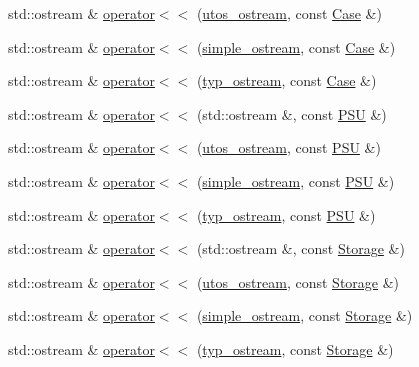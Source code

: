 \begin{DoxyCompactItemize}
\item 
std\+::ostream \& \mbox{\hyperlink{_parts_8h_ad6296c753aa62252b017bf4c78043d19}{operator$<$$<$}} (\mbox{\hyperlink{structutos__ostream}{utos\+\_\+ostream}}, const \mbox{\hyperlink{class_case}{Case}} \&)
\item 
std\+::ostream \& \mbox{\hyperlink{_parts_8h_aeefc09510afc2ba8ce5209d9bdf148eb}{operator$<$$<$}} (\mbox{\hyperlink{structsimple__ostream}{simple\+\_\+ostream}}, const \mbox{\hyperlink{class_case}{Case}} \&)
\item 
std\+::ostream \& \mbox{\hyperlink{_parts_8h_a2789caab23481c04ce93add5191f9e34}{operator$<$$<$}} (\mbox{\hyperlink{structtyp__ostream}{typ\+\_\+ostream}}, const \mbox{\hyperlink{class_case}{Case}} \&)
\item 
std\+::ostream \& \mbox{\hyperlink{_parts_8h_a1f7600c301fc3b2fbca76e13f0631ed7}{operator$<$$<$}} (std\+::ostream \&, const \mbox{\hyperlink{class_p_s_u}{P\+SU}} \&)
\item 
std\+::ostream \& \mbox{\hyperlink{_parts_8h_afea0ac8a7df9128093f476a85a5916ac}{operator$<$$<$}} (\mbox{\hyperlink{structutos__ostream}{utos\+\_\+ostream}}, const \mbox{\hyperlink{class_p_s_u}{P\+SU}} \&)
\item 
std\+::ostream \& \mbox{\hyperlink{_parts_8h_ac603ba9b4a93724275a4a4ae1d551896}{operator$<$$<$}} (\mbox{\hyperlink{structsimple__ostream}{simple\+\_\+ostream}}, const \mbox{\hyperlink{class_p_s_u}{P\+SU}} \&)
\item 
std\+::ostream \& \mbox{\hyperlink{_parts_8h_ad5b654dd7ea2f92dbf52e1890cd2ece8}{operator$<$$<$}} (\mbox{\hyperlink{structtyp__ostream}{typ\+\_\+ostream}}, const \mbox{\hyperlink{class_p_s_u}{P\+SU}} \&)
\item 
std\+::ostream \& \mbox{\hyperlink{_parts_8h_a2757424af823d03a26605c202c8c7507}{operator$<$$<$}} (std\+::ostream \&, const \mbox{\hyperlink{class_storage}{Storage}} \&)
\item 
std\+::ostream \& \mbox{\hyperlink{_parts_8h_a89feddfbb00e7f9938b507838513caae}{operator$<$$<$}} (\mbox{\hyperlink{structutos__ostream}{utos\+\_\+ostream}}, const \mbox{\hyperlink{class_storage}{Storage}} \&)
\item 
std\+::ostream \& \mbox{\hyperlink{_parts_8h_a19c0f4faabd62645061a1240bc221ae1}{operator$<$$<$}} (\mbox{\hyperlink{structsimple__ostream}{simple\+\_\+ostream}}, const \mbox{\hyperlink{class_storage}{Storage}} \&)
\item 
std\+::ostream \& \mbox{\hyperlink{_parts_8h_a97bccd137bb9fa33091a72492ccff54c}{operator$<$$<$}} (\mbox{\hyperlink{structtyp__ostream}{typ\+\_\+ostream}}, const \mbox{\hyperlink{class_storage}{Storage}} \&)

\end{DoxyCompactItemize}
